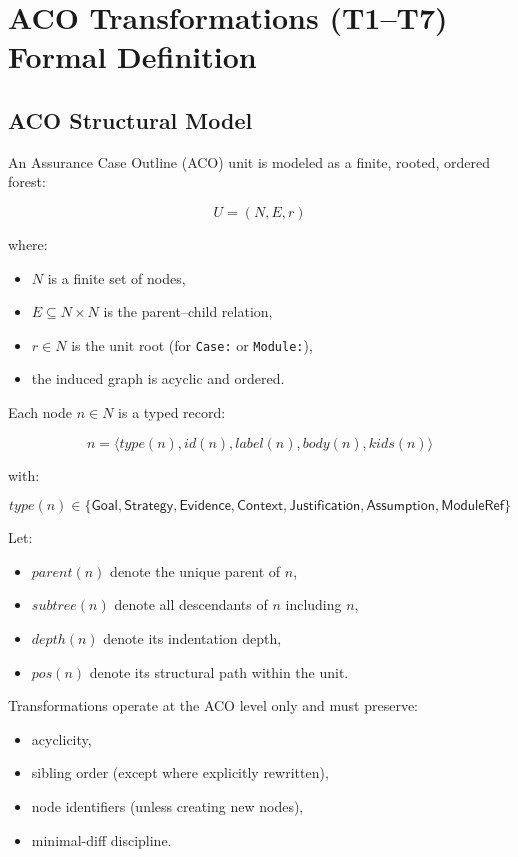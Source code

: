 \documentclass[12pt,twoside,a4paper]{article}
\begin{document}
\section{ACO Transformations (T1--T7) Formal Definition}\label{sec:formal_def}

\subsection{ACO Structural Model}

An Assurance Case Outline (ACO) unit is modeled as a finite, rooted, ordered forest:

\[
U = (N, E, r)
\]

where:

\begin{itemize}
  \item $N$ is a finite set of nodes,
  \item $E \subseteq N \times N$ is the parent--child relation,
  \item $r \in N$ is the unit root (for \texttt{Case:} or \texttt{Module:}),
  \item the induced graph is acyclic and ordered.
\end{itemize}

Each node $n \in N$ is a typed record:

\[
n = \langle type(n), id(n), label(n), body(n), kids(n) \rangle
\]

with:

\[
type(n) \in 
\{\mathsf{Goal}, \mathsf{Strategy}, \mathsf{Evidence}, 
\mathsf{Context}, \mathsf{Justification}, 
\mathsf{Assumption}, \mathsf{ModuleRef}\}
\]

Let:

\begin{itemize}
  \item $parent(n)$ denote the unique parent of $n$,
  \item $subtree(n)$ denote all descendants of $n$ including $n$,
  \item $depth(n)$ denote its indentation depth,
  \item $pos(n)$ denote its structural path within the unit.
\end{itemize}

Transformations operate at the ACO level only and must preserve:

\begin{itemize}
  \item acyclicity,
  \item sibling order (except where explicitly rewritten),
  \item node identifiers (unless creating new nodes),
  \item minimal-diff discipline.
\end{itemize}
\end{document}
